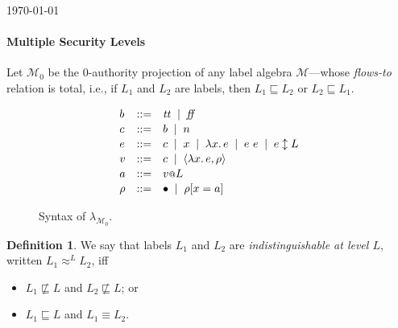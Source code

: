 \documentclass{article}
\makeatletter
\theoremstyle{definition}
\newtheorem{definition}{Definition}
\newcommand{\at}{\ensuremath{{\scriptstyle{@}}}}
\makeatother
\begin{document}
\begin{flushright}
  \today
\end{flushright}

\paragraph{Multiple Security Levels}
Let $\mathcal{M}_{0}$ be the 0-authority projection of any label algebra
$\mathcal{M}$---whose \emph{flows-to} relation is total, i.e., if $L_1$ and
$L_2$ are labels, then $L_1 \sqsubseteq L_2$ or $L_2 \sqsubseteq L_1$.

\begin{figure}[ht]
  \centering
  \[
  \begin{array}[t]{lcl}
    b & ::= &
    \mathit{tt}\;\; |\;\;
    \mathit{ff}
    \\[0.3ex]
    c & :: = &
    b\;\; |\;\;
    n
    \\[0.3ex]
    e & ::= &
    c\;\; |\;\;
    x\;\; |\;\;
    \lambda{x}.\, e\;\; |\;\;
    e\ e\;\; |\;\;
    e \updownarrow L
    \\[0.3ex]
    v & ::= &
    c\;\; |\;\;
    \langle{\lambda{x}.\, e, \rho\rangle}
    \\[0.3ex]
    a & ::= &
    v \at L
    \\[0.3ex]
    \rho & ::= &
    \bullet\;\; |\;\;
    \rho[x = a]
  \end{array}
  \]
  \caption{Syntax of $\lambda_{\mathcal{M}_{0}}$.}
  \label{fig:syntax}
\end{figure}

\begin{definition}
  We say that labels $L_1$ and $L_2$ are \emph{indistinguishable at
    level $L$}, written $L_1 \approx^{L} L_2$, iff
  \begin{itemize}
  \item
    $L_1 \not\sqsubseteq L$ and
    $L_2 \not\sqsubseteq L$; or
  \item
    $L_1 \sqsubseteq L$ and
    $L_1 \equiv L_2$.
  \end{itemize}
  \label{def:lab-equiv}
\end{definition}
\end{document}
